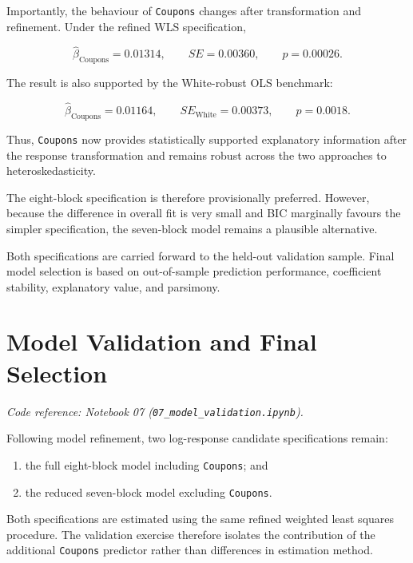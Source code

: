 \documentclass[11pt,a4paper]{article}
\begin{document}
Importantly, the behaviour of \texttt{Coupons} changes after transformation and refinement. Under the refined WLS specification,

\[
\hat{\beta}_{\text{Coupons}} = 0.01314,
\qquad
SE = 0.00360,
\qquad
p = 0.00026.
\]

The result is also supported by the White-robust OLS benchmark:

\[
\hat{\beta}_{\text{Coupons}} = 0.01164,
\qquad
SE_{\text{White}} = 0.00373,
\qquad
p = 0.0018.
\]

Thus, \texttt{Coupons} now provides statistically supported explanatory information after the response transformation and remains robust across the two approaches to heteroskedasticity.

The eight-block specification is therefore provisionally preferred. However, because the difference in overall fit is very small and BIC marginally favours the simpler specification, the seven-block model remains a plausible alternative.

Both specifications are carried forward to the held-out validation sample. Final model selection is based on out-of-sample prediction performance, coefficient stability, explanatory value, and parsimony.


\section{Model Validation and Final Selection}

\noindent\textit{Code reference: Notebook 07 (\texttt{07\_model\_validation.ipynb}).}

Following model refinement, two log-response candidate specifications remain:

\begin{enumerate}
    \item the full eight-block model including \texttt{Coupons}; and
    \item the reduced seven-block model excluding \texttt{Coupons}.
\end{enumerate}

Both specifications are estimated using the same refined weighted least squares procedure. The validation exercise therefore isolates the contribution of the additional \texttt{Coupons} predictor rather than differences in estimation method.
\end{document}
